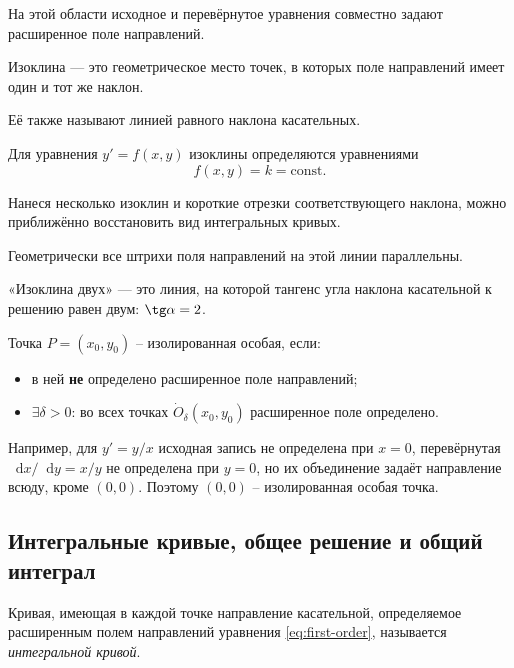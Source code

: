 \documentclass[12pt,a4paper]{article}
\numberwithin{equation}{section}
\newcommand{\Odp}[2]{\dot O_{#1}\!\left(#2\right)}
\newcommand{\dd}{\mathop{}\!\mathrm{d}}
\begin{document}
На этой области исходное и перевёрнутое уравнения совместно задают расширенное поле направлений.

\begin{definitionHSE}
Изоклина --- это геометрическое место точек, в которых поле направлений имеет один и тот же наклон.
\end{definitionHSE}

Её также называют линией равного наклона касательных.

Для уравнения \(y' = f(x, y)\) изоклины определяются уравнениями
\[
f(x,y)=k=\text{const}.
\]

\begin{remarkHSE}
Нанеся несколько изоклин и короткие отрезки соответствующего наклона, можно приближённо восстановить вид интегральных кривых.
\end{remarkHSE}

Геометрически все штрихи поля направлений на этой линии параллельны.

\begin{exampleHSE}
«Изоклина двух» --- это линия, на которой тангенс угла наклона касательной к решению равен двум: \(\tg\alpha = 2\).
\end{exampleHSE}

\begin{definitionHSE}
Точка \(P=(x_0,y_0)\) -- изолированная особая, если:
\begin{itemize}
\item в ней \textbf{не} определено расширенное поле направлений;
\item \(\exists\delta>0\): во всех точках \(\Odp{\delta}{x_0,y_0}\) расширенное поле определено.
\end{itemize} 
\end{definitionHSE}

Например, для \(y' = y/x\) исходная запись не определена при \(x = 0\), перевёрнутая
\({\dd x}/{\dd y} = x/y\) не определена при \(y = 0\), но их объединение задаёт направление всюду,
кроме \((0, 0)\). Поэтому \((0, 0)\) – изолированная особая точка.

\subsection{Интегральные кривые, общее решение и общий интеграл}

\begin{definitionHSE}
Кривая, имеющая в каждой точке направление касательной, определяемое расширенным полем направлений уравнения \eqref{eq:first-order}, называется \textit{интегральной кривой}.
\end{definitionHSE}
\end{document}
